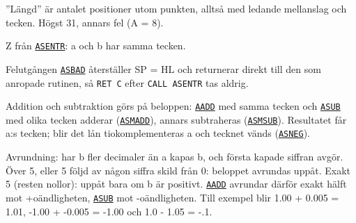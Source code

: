 \begin{Listing}
\begin{Note}
\begin{Verb}
\end{Verb}
\par\noindent  ”Längd” är antalet positioner utom punkten, alltså med ledande mellanslag och tecken. Högst 31, annars fel (A = 8).\par
\par\noindent Z från \hyperlink{l:ASENTR}{\texttt{ASENTR}}: a och b har samma tecken.\par
\par\noindent Felutgången \hyperlink{l:ASBAD}{\texttt{ASBAD}} återställer SP = HL{} och returnerar direkt till den som anropade rutinen, så \texttt{RET C} efter \texttt{CALL ASENTR} tas aldrig.\par
\par\noindent Addition och subtraktion görs på beloppen: \hyperlink{l:AADD}{\texttt{AADD}} med samma tecken och \hyperlink{l:ASUB}{\texttt{ASUB}} med olika tecken adderar (\hyperlink{l:ASMADD}{\texttt{ASMADD}}), annars subtraheras (\hyperlink{l:ASMSUB}{\texttt{ASMSUB}}). Resultatet får a:s tecken; blir det lån tiokomplementeras a och tecknet vänds (\hyperlink{l:ASNEG}{\texttt{ASNEG}}).\par
\par\noindent Avrundning: har b fler decimaler än a kapas b, och första kapade siffran avgör. Över 5, eller 5 följd av någon siffra skild från 0: beloppet avrundas uppåt. Exakt 5 (resten nollor): uppåt bara om b är positivt. \hyperlink{l:AADD}{\texttt{AADD}} avrundar därför exakt hälft mot +oändligheten, \hyperlink{l:ASUB}{\texttt{ASUB}} mot -oändligheten. Till exempel blir 1.00 + 0.005 = 1.01, \mbox{-}1.00 + \mbox{-}0.005 = \mbox{-}1.00 och 1.0 - 1.05 = \mbox{-}.1.\par\end{Note}

\end{Listing}
